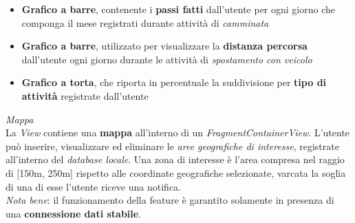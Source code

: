 \documentclass{article}
\begin{document}
    \begin{itemize}
        \renewcommand{\labelitemi}{-}
        \item \textbf{Grafico a barre}, contenente i \textbf{passi fatti} dall'utente per ogni giorno che componga il mese registrati durante attività di \textit{camminata}
        \item \textbf{Grafico a barre}, utilizzato per visualizzare la \textbf{distanza percorsa} dall'utente ogni giorno durante le attività di \textit{spostamento con veicolo}
        \item \textbf{Grafico a torta}, che riporta in percentuale la suddivisione per \textbf{tipo di attività} registrate dall'utente
    \end{itemize}
    \textit{Mappa} \vspace*{7pt}\\
    La \textit{View} contiene una \textbf{mappa} all'interno di un \textit{FragmentContainerView}. L'utente può inserire, visualizzare ed eliminare le \textit{aree geografiche di interesse}, registrate all'interno del \textit{database locale}. Una zona di interesse è l'area compresa nel raggio di [150m, 250m] rispetto alle coordinate geografiche selezionate, varcata la soglia di una di esse l'utente riceve una notifica. \vspace*{7pt}\\
    \textit{Nota bene}: il funzionamento della feature è garantito solamente in presenza di una \textbf{connessione dati stabile}.
\end{document}

